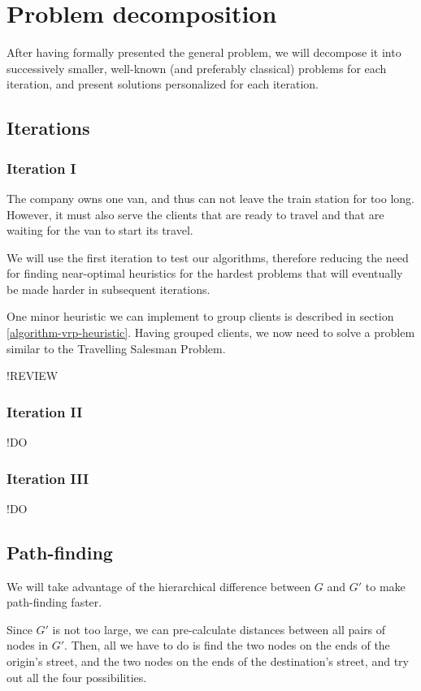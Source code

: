 \chapter{Problem decomposition} \label{problem-decomposition}
After having formally presented the general problem, we will decompose it into successively smaller, well-known (and preferably classical) problems for each iteration, and present solutions personalized for each iteration.

\section{Iterations} \label{problem-decomposition-iterations}
\subsection{Iteration I}
The company owns one van, and thus can not leave the train station for too long. However, it must also serve the clients that are ready to travel and that are waiting for the van to start its travel.\par
We will use the first iteration to test our algorithms, therefore reducing the need for finding near-optimal heuristics for the hardest problems that will eventually be made harder in subsequent iterations.\par
One minor heuristic we can implement to group clients is described in section \ref{algorithm-vrp-heuristic}. Having grouped clients, we now need to solve a problem similar to the Travelling Salesman Problem.\par
!REVIEW
\subsection{Iteration II}
!DO
\subsection{Iteration III}
!DO
\section{Path-finding} \label{problem-decomposition-pathfinding}
We will take advantage of the hierarchical difference between $G$ and $G'$ to make path-finding faster.\par
Since $G'$ is not too large, we can pre-calculate distances between all pairs of nodes in $G'$.
Then, all we have to do is find the two nodes on the ends of the origin's street, and the two nodes on the ends of the destination's street, and try out all the four possibilities.
